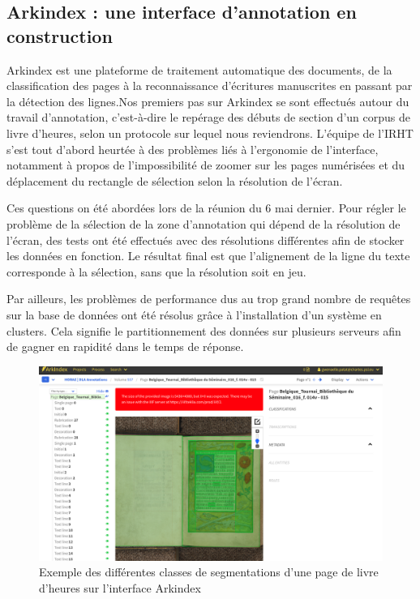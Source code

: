 \documentclass[a4paper,12pt,twoside]{book}
\begin{document}
	
	\subsection{\label{arkindex}Arkindex : une interface d’annotation en construction}
	
		Arkindex est une plateforme de traitement automatique des documents, de la classification des pages à la reconnaissance d’écritures manuscrites en passant par la détection des lignes.Nos premiers pas sur Arkindex se sont effectués autour du travail d'annotation, c'est-à-dire le repérage des débuts de section d'un corpus de livre d'heures, selon un protocole sur lequel nous reviendrons. L'équipe de l'IRHT s'est tout d'abord heurtée à des problèmes liés à l'ergonomie de l'interface, notamment à propos de l'impossibilité de zoomer sur les pages numérisées et du déplacement du rectangle de sélection selon la résolution de l'écran. 
		
	Ces questions on été abordées lors de la réunion du 6 mai dernier. Pour régler le problème de la sélection de la zone d’annotation qui dépend de la résolution de l’écran, des tests ont été effectués avec des résolutions différentes afin de stocker les données en fonction. Le résultat final est que l'alignement de la ligne du texte corresponde à la sélection, sans que la résolution soit en jeu.
	
	 Par ailleurs, les problèmes de performance dus au trop grand nombre de requêtes sur la base de données ont été résolus grâce à l'installation d’un système en clusters. Cela signifie le partitionnement des données sur plusieurs serveurs afin de gagner en rapidité dans le temps de réponse. \\
	 
	\begin{figure}[!h]
    \centering
    \includegraphics[width=13cm]{img/ML/interface_arkindex_detection_page.png}

    \caption{Exemple des différentes classes de segmentations d'une page de livre d'heures sur l'interface Arkindex}
    \end{figure}
	
\end{document}
